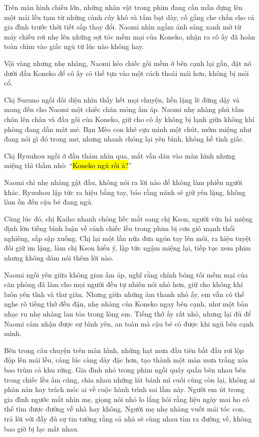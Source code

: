 \documentclass[../main.tex]{subfiles}
\begin{document}
Trên màn hình chiếu lớn, những nhân vật trong phim đang cần mẫn dựng lên một mái lều tạm từ những cành cây khô và tấm bạt dày, cố gắng che chắn cho cả gia đình trước thời tiết sắp thay đổi. Naomi nhìn ngắm ánh sáng xanh mờ từ máy chiếu rơi nhẹ lên những sợi tóc mềm mại của Koneko, nhận ra cô ấy đã hoàn toàn chìm vào giấc ngủ từ lúc nào không hay.

Vội vàng nhưng nhẹ nhàng, Naomi kéo chiếc gối mềm ở bên cạnh lại gần, đặt nó dưới đầu Koneko để cô ấy có thể tựa vào một cách thoải mái hơn, không bị mỏi cổ. 

Chị Suzuno ngồi đối diện nhìn thấy hết mọi chuyện, liền lặng lẽ đứng dậy và mang đến cho Naomi một chiếc chăn mỏng ấm áp. Naomi nhẹ nhàng phủ tấm chăn lên chân và đầu gối của Koneko, giữ cho cô ấy không bị lạnh giữa không khí phòng đang dần mát mẻ. Bạn Mèo con khẽ cựa mình một chút, mớm miệng như đang nói gì đó trong mơ, nhưng nhanh chóng lại yên bình, không hề tỉnh giấc.

Chị Ryuuhou ngồi ở đầu thảm nhìn qua, mắt vẫn dán vào màn hình nhưng miệng thì thầm nhỏ: ``\hl{Koneko ngủ rồi à?}''

Naomi chỉ nhẹ nhàng gật đầu, không nói ra lời nào để không làm phiền người khác. Ryuuhou lập tức ra hiệu bằng tay, báo rằng mình sẽ giữ yên lặng, không làm ồn đến cậu bé đang ngủ.

Cùng lúc đó, chị Kaiho nhanh chóng liếc mắt sang chị Kson, người vừa há miệng định lớn tiếng bình luận về cảnh chiếc lều trong phim bị cơn gió mạnh thổi nghiêng, sắp sập xuống. Chị lại một lần nữa đưa ngón tay lên môi, ra hiệu tuyệt đối giữ im lặng, làm chị Kson hiểu ý, lập tức ngậm miệng lại, tiếp tục xem phim nhưng không dám nói thêm lời nào.

Naomi ngồi yên giữa không gian ấm áp, nghĩ rằng chính bóng tối mềm mại của căn phòng đã làm cho mọi người đều tự nhiên nói nhỏ hơn, giữ cho không khí luôn yên tĩnh và thư giãn. Nhưng giữa những âm thanh nhỏ ấy, em vẫn có thể nghe rõ tiếng thở đều đặn, nhẹ nhàng của Koneko ngay bên cạnh, như một bản nhạc ru nhẹ nhàng lan tỏa trong lòng em. Tiếng thở ấy rất nhỏ, nhưng lại đủ để Naomi cảm nhận được sự bình yên, an toàn mà cậu bé có được khi ngủ bên cạnh mình.

\ct

Bên trong câu chuyện trên màn hình, những hạt mưa đầu tiên bắt đầu rơi lộp độp lên mái lều, càng lúc càng dày đặc hơn, tạo thành một màn mưa trắng xóa bao trùm cả khu rừng. Gia đình nhỏ trong phim ngồi quây quần bên nhau bên trong chiếc lều ấm cúng, chia nhau những lát bánh mì cuối cùng còn lại, không ai phàn nàn hay trách móc ai về cuộc hành trình sai lầm này. Người em út trong gia đình ngước mắt nhìn mẹ, giọng nói nhỏ lo lắng hỏi rằng liệu ngày mai họ có thể tìm được đường về nhà hay không. Người mẹ nhẹ nhàng vuốt mái tóc con, trả lời với đầy đủ sự tin tưởng rằng cả nhà sẽ cùng nhau tìm ra đường về, không bao giờ bị lạc mất nhau.
\end{document}
